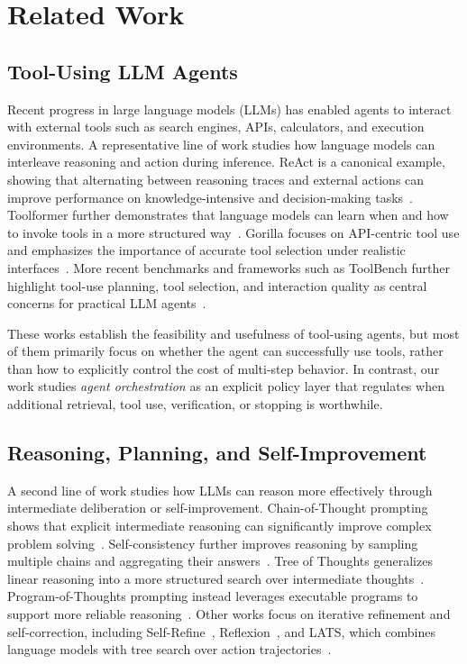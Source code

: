 \section{Related Work}

\subsection{Tool-Using LLM Agents}

Recent progress in large language models (LLMs) has enabled agents to interact with external tools such as search engines, APIs, calculators, and execution environments. A representative line of work studies how language models can interleave reasoning and action during inference. ReAct is a canonical example, showing that alternating between reasoning traces and external actions can improve performance on knowledge-intensive and decision-making tasks~\cite{yao2023react}. Toolformer further demonstrates that language models can learn when and how to invoke tools in a more structured way~\cite{schick2023toolformer}. Gorilla focuses on API-centric tool use and emphasizes the importance of accurate tool selection under realistic interfaces~\cite{patil2023gorilla}. More recent benchmarks and frameworks such as ToolBench further highlight tool-use planning, tool selection, and interaction quality as central concerns for practical LLM agents~\cite{qin2023toolbench}.

These works establish the feasibility and usefulness of tool-using agents, but most of them primarily focus on whether the agent can successfully use tools, rather than how to explicitly control the cost of multi-step behavior. In contrast, our work studies \emph{agent orchestration} as an explicit policy layer that regulates when additional retrieval, tool use, verification, or stopping is worthwhile.

\subsection{Reasoning, Planning, and Self-Improvement}

A second line of work studies how LLMs can reason more effectively through intermediate deliberation or self-improvement. Chain-of-Thought prompting shows that explicit intermediate reasoning can significantly improve complex problem solving~\cite{wei2022chain}. Self-consistency further improves reasoning by sampling multiple chains and aggregating their answers~\cite{wang2023selfconsistency}. Tree of Thoughts generalizes linear reasoning into a more structured search over intermediate thoughts~\cite{yao2023tree}. Program-of-Thoughts prompting instead leverages executable programs to support more reliable reasoning~\cite{chen2023program}. Other works focus on iterative refinement and self-correction, including Self-Refine~\cite{madaan2023selfrefine}, Reflexion~\cite{shinn2023reflexion}, and LATS, which combines language models with tree search over action trajectories~\cite{zhou2024lats}.

